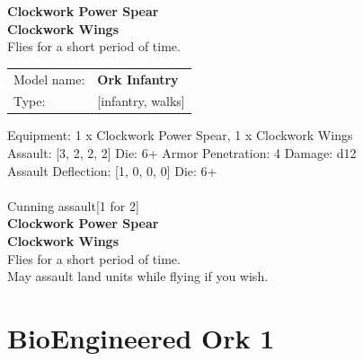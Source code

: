 {\bf Clockwork Power Spear } \\






{\bf Clockwork Wings } \\

Flies for a short period of time.\\ 





 



\begin{tabular}{ll}
Model name: & {\bf Ork Infantry } \\
Type: & [infantry, walks] \\
\end{tabular}

Equipment: 1 x Clockwork Power Spear, 1 x Clockwork Wings \\

Assault: [3, 2, 2, 2] Die: 6+ Armor Penetration: 4 Damage: d12 \\
Assault Deflection: [1, 0, 0, 0] Die: 6+\\
\\ 
Cunning assault[1 for 2]\\ 
 



{\bf Clockwork Power Spear } \\






{\bf Clockwork Wings } \\

Flies for a short period of time.\\ 
May assault land units while flying if you wish.



 















\clearpage

\section{ BioEngineered Ork 1 }

